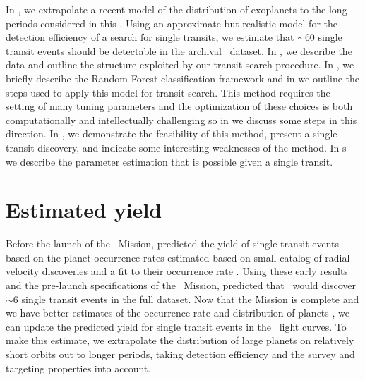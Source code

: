 In , we extrapolate a recent model of the distribution of exoplanets
to the long periods considered in this \paper.
Using an approximate but realistic model for the detection efficiency of a
search for single transits, we estimate that $\sim 60$ single transit events
should be detectable in the archival \kepler\ dataset.
In , we describe the data and outline the structure exploited by
our transit search procedure.
In , we briefly describe the Random Forest classification framework
and in  we outline the steps used to apply this model for transit
search.
This method requires the setting of many tuning parameters and the
optimization of these choices is both computationally and intellectually
challenging so in  we discuss some steps in this direction.
In , we demonstrate the feasibility of this method, present a
single transit discovery, and indicate some interesting weaknesses of the
method.
In \sectionname s~ we describe the parameter estimation that
is possible given a single transit.



\section{Estimated yield}

Before the launch of the \kepler\ Mission, \citet{Yee:2008} predicted the
yield of single transit events based on the planet occurrence rates estimated
based on small catalog of radial velocity discoveries \citep{Butler:2006} and
a fit to their occurrence rate \citep{Cumming:2008}.
Using these early results and the pre-launch specifications of the \kepler\
Mission, \citet{Yee:2008} predicted that \kepler\ would discover $\sim 6$
single transit events in the full dataset.
Now that the Mission is complete and we have better estimates of the
occurrence rate and distribution of planets \citep[for example][]{Dong:2013,
Petigura:2013, Foreman-Mackey:2014, Dressing:2015}, we can update the
predicted yield for single transit events in the \kepler\ light curves.
To make this estimate, we extrapolate the distribution of large planets on
relatively short orbits out to longer periods, taking detection efficiency
and the survey and targeting properties into account.

